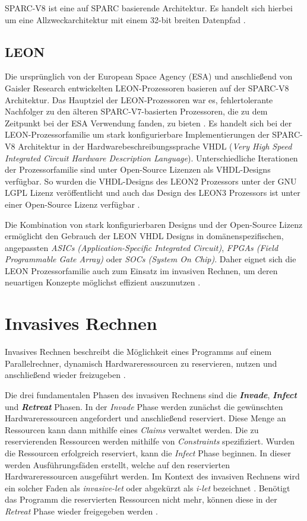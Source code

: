 SPARC-V8 ist eine auf SPARC basierende Architektur. Es handelt sich hierbei um eine Allzweckarchitektur mit einem
32-bit breiten Datenpfad \cite{sparcv8Eval}.

\subsection{LEON}

Die ursprünglich von der European Space Agency (ESA) und anschließend von Gaisler Research entwickelten
LEON-Prozessoren basieren auf der SPARC-V8 Architektur.
Das Hauptziel der LEON-Prozessoren war es, fehlertolerante Nachfolger zu den älteren SPARC-V7-basierten
Prozessoren, die zu dem Zeitpunkt bei der ESA Verwendung fanden, zu bieten \cite{gaislerLeon}.
Es handelt sich bei der LEON-Prozessorfamilie um stark konfigurierbare
Implementierungen der SPARC-V8 Architektur in der Hardwarebeschreibungssprache
VHDL (\textit{Very High Speed Integrated Circuit Hardware Description Language}).
Unterschiedliche Iterationen der Prozessorfamilie sind unter Open-Source Lizenzen als VHDL-Designs verfügbar.
So wurden die VHDL-Designs des LEON2 Prozessors unter der GNU LGPL Lizenz veröffentlicht \cite{sparcv8Eval} und
auch das Design des LEON3 Prozessors ist unter einer Open-Source Lizenz verfügbar \cite{invasiveArrays}.

Die Kombination von stark konfigurierbaren Designs und der Open-Source Lizenz ermöglicht den Gebrauch der
LEON VHDL Designs in domänenspezifischen, angepassten \textit{ASICs (Application-Specific Integrated Circuit)},
\textit{FPGAs (Field Programmable Gate Array)} oder \textit{SOCs (System On Chip)}.
Daher eignet sich die LEON Prozessorfamilie auch zum Einsatz im invasiven Rechnen,
um deren neuartigen Konzepte möglichst effizient auszunutzen \cite{sparcv8Eval}.

\section{Invasives Rechnen}

Invasives Rechnen beschreibt die Möglichkeit eines Programms auf einem Parallelrechner,
dynamisch Hardwareressourcen zu reservieren, nutzen und anschließend wieder freizugeben \cite{octopos}.

Die drei fundamentalen Phasen des invasiven Rechnens sind die \textit{\textbf{Invade}}, \textit{\textbf{Infect}}
und \textit{\textbf{Retreat}} Phasen. In der \textit{Invade} Phase werden zunächst die gewünschten
Hardwareressourcen angefordert und anschließend reserviert. Diese Menge an Ressourcen kann dann mithilfe
eines \textit{Claims} verwaltet werden. Die zu reservierenden Ressourcen werden mithilfe von \textit{Constraints}
spezifiziert.
Wurden die Ressourcen erfolgreich reserviert, kann die \textit{Infect}
Phase beginnen. In dieser werden Ausführungsfäden erstellt,
welche auf den reservierten Hardwareressourcen ausgeführt werden. Im Kontext des invasiven Rechnens wird ein solcher
Faden als \textit{invasive-let} oder abgekürzt als \textit{i-let} bezeichnet \cite{invasiveCommonTerms}.
Benötigt das Programm die reservierten Ressourcen nicht mehr, können diese in der \textit{Retreat} Phase wieder
freigegeben werden \cite{octopos}.

